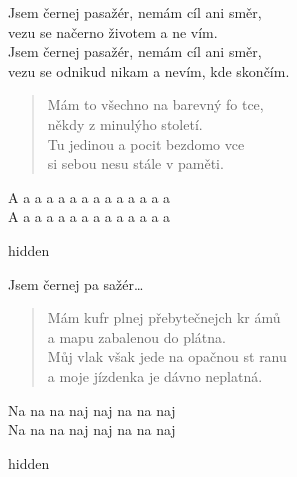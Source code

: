 \begin{song}{}
\chordbreak
\compactbreak

\begin{refren}
   Jsem černej pasažér, nemám cíl ani směr, \\
   vezu se načerno životem a ne vím. \\
   Jsem černej pasažér, nemám cíl ani směr, \\
   vezu se odnikud nikam a nevím, kde skončím.
\end{refren}
\begin{verse}
   Mám to všechno na barevný fo tce, \\
   někdy z minulýho století.  \\
   Tu jedinou a pocit bezdomo vce \\
   si sebou nesu stále v paměti. 
\end{verse}
\begin{deco}
   A a a a a a a a a a a a a a \\
   A a a a a a a a a a a a a a
\end{deco}
\begin{optional}{hidden}
  
\end{optional}
\begin{refren}
   Jsem černej pa sažér\ldots
\end{refren}
\begin{verse}
   Mám kufr plnej přebytečnejch kr ámů \\
   a mapu zabalenou do plátna.  \\
   Můj vlak však jede na opačnou st ranu \\
   a moje jízdenka je dávno neplatná.
\end{verse}
\begin{deco}
   Na na na naj naj na na naj \\
   Na na na naj naj na na naj 
\end{deco}
\begin{optional}{hidden}
  
\end{optional}
\end{song}
\pagebreak
